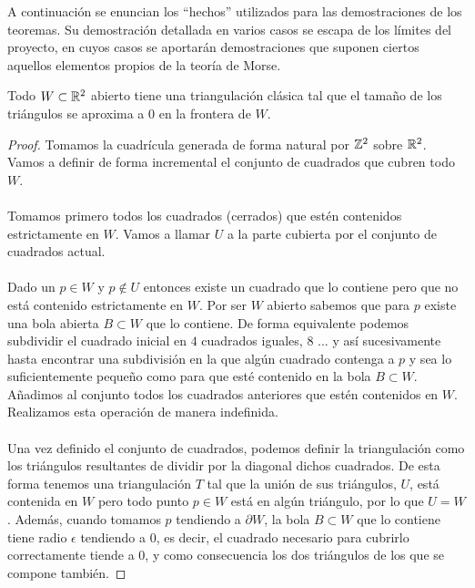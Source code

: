 
A continuación se enuncian los ``hechos'' utilizados para las demostraciones de los teoremas. Su demostración detallada en varios casos se escapa de los límites del proyecto, en cuyos casos se aportarán demostraciones que suponen ciertos aquellos elementos propios de la teoría de Morse.

\begin{hecho}
	Todo $W \subset \mathbb{R}^2$ abierto tiene una triangulación clásica tal que el tamaño de los triángulos se aproxima a $0$ en la frontera de $W$.
\end{hecho}

\begin{proof}
	Tomamos la cuadrícula generada de forma natural por $\mathbb{Z}^2$ sobre $\mathbb{R}^2$. Vamos a definir de forma incremental el conjunto de cuadrados que cubren todo $W$.\\
	\\ Tomamos primero todos los cuadrados (cerrados) que estén contenidos estrictamente en $W$. Vamos a llamar $U$ a la parte cubierta por el conjunto de cuadrados actual.\\
	\\ Dado un $p \in W$ y $p \not \in U$ entonces existe un cuadrado que lo contiene pero que no está contenido estrictamente en $W$. Por ser $W$ abierto sabemos que para $p$ existe una bola abierta $B \subset W$ que lo contiene. De forma equivalente podemos subdividir el cuadrado inicial en $4$ cuadrados iguales, $8$ ... y así sucesivamente hasta encontrar una subdivisión en la que algún cuadrado contenga a $p$ y sea lo suficientemente pequeño como para que esté contenido en la bola $B \subset W$. Añadimos al conjunto todos los cuadrados anteriores que estén contenidos en $W$. Realizamos esta operación de manera indefinida.\\
	\\ Una vez definido el conjunto de cuadrados, podemos definir la triangulación como los triángulos resultantes de dividir por la diagonal dichos cuadrados. De esta forma tenemos una triangulación $T$ tal que la unión de sus triángulos, $U$, está contenida en $W$ pero todo punto $p \in W$ está en algún triángulo, por lo que $U = W$. Además, cuando tomamos $p$ tendiendo a $\partial W$, la bola $B \subset W$ que lo contiene tiene radio $\epsilon$ tendiendo a $0$, es decir, el cuadrado necesario para cubrirlo correctamente tiende a $0$, y como consecuencia los dos triángulos de los que se compone también.
\end{proof}

